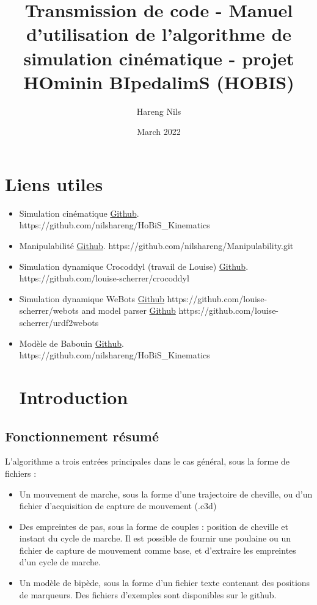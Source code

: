 \documentclass{article}
\title{Transmission de code - Manuel d'utilisation de l'algorithme de simulation cinématique - projet HOminin BIpedalimS (HOBIS)}
\author{Hareng Nils}
\date{March 2022}
\begin{document}
\maketitle

\section{Liens utiles}

\begin{itemize}
    \item Simulation cinématique \hyperlink{https://github.com/nilshareng/HoBiS_Kinematics}{Github}. https://github.com/nilshareng/HoBiS\_Kinematics
    
    \item Manipulabilité \hyperlink{https://github.com/nilshareng/Manipulability.git}{Github}. https://github.com/nilshareng/Manipulability.git

    \item Simulation dynamique Crocoddyl (travail de Louise) \hyperlink{https://github.com/louise-scherrer/crocoddyl}{Github}. https://github.com/louise-scherrer/crocoddyl
    
    \item Simulation dynamique WeBots \hyperlink{https://github.com/louise-scherrer/webots}{Github} https://github.com/louise-scherrer/webots and model parser \hyperlink{https://github.com/louise-scherrer/urdf2webots}{Github} https://github.com/louise-scherrer/urdf2webots
    
    \item Modèle de Babouin \hyperlink{https://github.com/nilshareng/HoBiS_Kinematics}{Github}. https://github.com/nilshareng/HoBiS\_Kinematics
    
\section{Introduction}


\end{itemize}

\subsection{Fonctionnement résumé}

L'algorithme a trois entrées principales dans le cas général, sous la forme de fichiers :
\begin{itemize}
    \item Un mouvement de marche, sous la forme d'une trajectoire de cheville, ou d'un fichier d'acquisition de capture de mouvement (.c3d)
    \item Des empreintes de pas, sous la forme de couples : position de cheville et instant du cycle de marche. Il est possible de fournir une poulaine ou un fichier de capture de mouvement comme base, et d'extraire les empreintes d'un cycle de marche.
    
    \item Un modèle de bipède, sous la forme d'un fichier texte contenant des positions de marqueurs. Des fichiers d'exemples sont disponibles sur le github.
\end{itemize}
\end{document}
